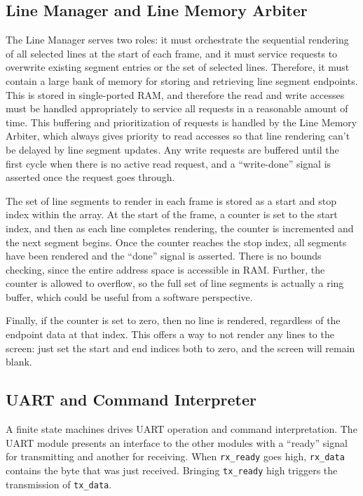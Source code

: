 \documentclass[11pt,conference]{IEEEtran}
\begin{document}
\subsection{Line Manager and Line Memory Arbiter}
The Line Manager serves two roles: it must orchestrate the sequential rendering of all selected lines at the start of each frame, and it must service requests to overwrite existing segment entries or the set of selected lines.
Therefore, it must contain a large bank of memory for storing and retrieving line segment endpoints.
This is stored in single-ported RAM, and therefore the read and write accesses must be handled appropriately to service all requests in a reasonable amount of time.
This buffering and prioritization of requests is handled by the Line Memory Arbiter, which always gives priority to read accesses so that line rendering can't be delayed by line segment updates.
Any write requests are buffered until the first cycle when there is no active read request, and a ``write-done'' signal is asserted once the request goes through.

The set of line segments to render in each frame is stored as a start and stop index within the array. At the start of the frame, a counter is set to the start index, and then as each line completes rendering, the counter is incremented and the next segment begins.
Once the counter reaches the stop index, all segments have been rendered and the ``done'' signal is asserted.
There is no bounds checking, since the entire address space is accessible in RAM\@.
Further, the counter is allowed to overflow, so the full set of line segments is actually a ring buffer, which could be useful from a software perspective.

Finally, if the counter is set to zero, then no line is rendered, regardless of the endpoint data at that index.
This offers a way to not render any lines to the screen: just set the start and end indices both to zero, and the screen will remain blank.

\subsection{UART and Command Interpreter}
A finite state machines drives UART operation and command interpretation.
The UART module presents an interface to the other modules with a ``ready'' signal for transmitting and another for receiving.
When \texttt{rx\_ready} goes high, \texttt{rx\_data} contains the byte that was just received.
Bringing \texttt{tx\_ready} high triggers the transmission of \texttt{tx\_data}.
\end{document}
